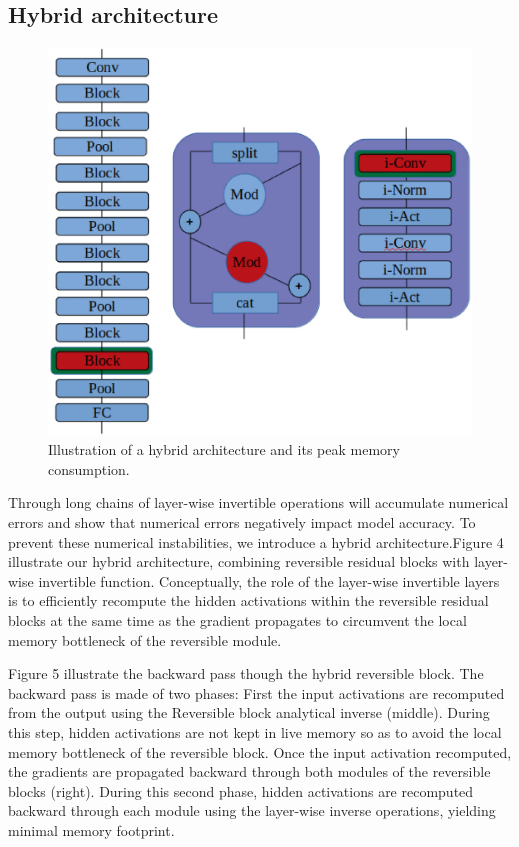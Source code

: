 \documentclass[10pt,twocolumn,letterpaper]{article}
\begin{document}
\subsection{Hybrid architecture}
\begin{figure}[h]
\begin{center}
\includegraphics[height=0.5\linewidth]{Figure3.eps}
\end{center}
   \caption{Illustration of a hybrid architecture and its peak
memory consumption.}
\end{figure}
Through long chains of layer-wise invertible operations will accumulate numerical errors and show that numerical errors negatively impact model accuracy. To prevent these numerical instabilities, we introduce a hybrid architecture.Figure 4 illustrate our hybrid architecture, combining reversible residual blocks with layer-wise invertible function. Conceptually, the role of the layer-wise invertible layers is to efficiently recompute the hidden activations within the reversible residual blocks at the same time as the gradient propagates to circumvent the local memory bottleneck of the reversible module. 

Figure 5 illustrate the backward pass though the hybrid reversible block. The backward pass is made of two phases: 
First the input activations are recomputed from the output using the Reversible block analytical inverse (middle).
During this step, hidden activations are not kept in live memory so as to avoid the local memory bottleneck of the reversible block.
Once the input activation recomputed, the gradients are propagated backward through both modules of the reversible blocks (right).
During this second phase, hidden activations are recomputed backward through each module using the layer-wise inverse operations, yielding minimal memory footprint.
\end{document}
